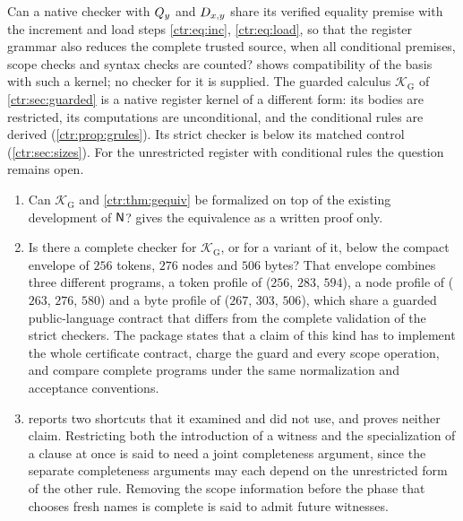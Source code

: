 \begin{question}
Can a native checker with $Q_{y}$ and $D_{x,y}$ share its verified equality premise with
the increment and load steps \eqref{ctr:eq:inc}, \eqref{ctr:eq:load}, so that the register
grammar also reduces the complete trusted source, when all conditional premises, scope
checks and syntax checks are counted?  shows compatibility of the
basis with such a kernel; no checker for it is supplied. The guarded calculus
$\mathcal K_{\mathrm G}$ of \cref{ctr:sec:guarded} is a native register kernel of a different
form: its bodies are restricted, its computations are unconditional, and the conditional
rules are derived (\cref{ctr:prop:grules}). Its strict checker is below its matched control
(\cref{ctr:sec:sizes}). For the unrestricted register with conditional rules the question
remains open.
\end{question}

\begin{question}
\begin{enumerate}
\item Can $\mathcal K_{\mathrm G}$ and \cref{ctr:thm:gequiv} be formalized on top of the
existing development of $\mathsf{N}$?  gives the equivalence as a written
proof only.
\item Is there a complete checker for $\mathcal K_{\mathrm G}$, or for a variant of it, below
the compact envelope of $256$ tokens, $276$ nodes and $506$ bytes? That envelope combines
three different programs, a token profile of  ($256$, $283$,
$594$), a node profile of  ($263$, $276$, $580$) and a byte
profile of  ($267$, $303$, $506$), which share a guarded
public-language contract that differs from the complete validation of the strict checkers.
The package states that a claim of this kind has to implement the whole certificate
contract, charge the guard and every scope operation, and compare complete programs under
the same normalization and acceptance conventions.
\item {} reports two shortcuts that it examined and did not use, and
proves neither claim. Restricting both the introduction of a witness and the specialization
of a clause at once is said to need a joint completeness argument, since the separate
completeness arguments may each depend on the unrestricted form of the other rule. Removing
the scope information before the phase that chooses fresh names is complete is said to
admit future witnesses.
\end{enumerate}
\end{question}


